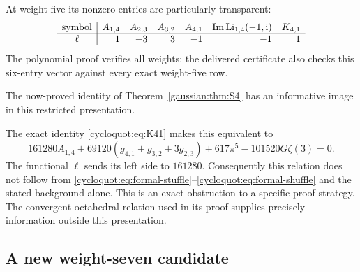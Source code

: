 At weight five its nonzero entries are particularly transparent:
\[
\begin{array}{c|rrrrrr}
 \text{symbol}&A_{1,4}&A_{2,3}&A_{3,2}&A_{4,1}
       &\operatorname{Im}\operatorname{Li}_{1,4}(-1,\mathrm{i})&K_{4,1}\\ \hline
 \ell&1&-3&3&-1&-1&1
\end{array}
\]
The polynomial proof verifies all weights; the delivered certificate
also checks this six-entry vector against every exact weight-five row.

The now-proved identity of Theorem~\ref{gaussian:thm:S4} has an
informative image in this restricted presentation.

The exact identity \eqref{cycloquot:eq:K41} makes this equivalent to
\begin{equation}\label{cycloquot:eq:S4-A}
 161280A_{1,4}+69120(g_{4,1}+g_{3,2}+3g_{2,3})
       +617\pi^5-101520G\zeta(3)=0.
\end{equation}
The functional \(\ell\) sends its left side to \(161280\).
Consequently this relation does not follow from
\eqref{cycloquot:eq:formal-stuffle}--\eqref{cycloquot:eq:formal-shuffle} and the stated
background alone. This is an exact obstruction to a specific proof
strategy. The convergent octahedral relation used in its proof supplies precisely information outside this presentation.

\subsection{A new weight-seven candidate}

